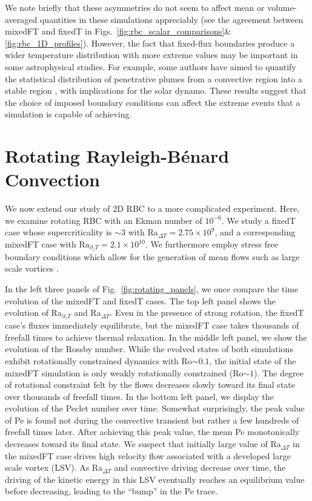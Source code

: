 \documentclass[aps, pre, onecolumn, nofootinbib, notitlepage, groupedaddress, amsfonts, amssymb, amsmath, longbibliography]{revtex4-1}
\newcommand{\RB}{Rayleigh-B\'{e}nard }
\begin{document}
We note briefly that these asymmetries do not seem to affect mean or volume-averaged quantities in these simulations appreciably (see the agreement between mixedFT and fixedT in Figs.~\ref{fig:rbc_scalar_comparisons}\&\ref{fig:rbc_1D_profiles}).
However, the fact that fixed-flux boundaries produce a wider temperature distribution with more extreme values may be important in some astrophysical studies.
For example, some authors have aimed to quantify the statistical distribution of penetrative plumes from a convective region into a stable region \cite{pratt&all2017}, with implications for the solar dynamo.
These results suggest that the choice of imposed boundary conditions can affect the extreme events that a simulation is capable of achieving.





\section{Rotating \RB Convection}
\label{sec:rotating_results}
We now extend our study of 2D RBC to a more complicated experiment.
Here, we examine rotating RBC with an Ekman number of $10^{-6}$.
We study a fixedT case whose supercriticality is $\sim 3$ with Ra$_{\Delta T} = 2.75\times 10^9$, and a corresponding mixedFT case with $\text{Ra}_{\partial_z T} = 2.1 \times 10^{10}$.
We furthermore employ stress free boundary conditions which allow for the generation of mean flows such as large scale vortices \cite{couston&all2019}.

In the left three panels of Fig.~\ref{fig:rotating_panels}, we once compare the time evolution of the mixedFT and fixedT cases.
The top left panel shows the evolution of Ra$_{\partial_z T}$ and Ra$_{\Delta T}$.
Even in the presence of strong rotation, the fixedT case's fluxes immediately equilibrate, but the mixedFT case takes thousands of freefall times to achieve thermal relaxation.
In the middle left panel, we show the evolution of the Rossby number.
While the evolved states of both simulations exhibit rotationally constrained dynamics with Ro$\sim 0.1$, the initial state of the mixedFT simulation is only weakly rotationally constrained (Ro$\sim 1$).
The degree of rotational constraint felt by the flows decreases slowly toward its final state over thousands of freefall times.
In the bottom left panel, we display the evolution of the Peclet number over time.
Somewhat surprisingly, the peak value of Pe is found not during the convective transient but rather a few hundreds of freefall times later.
After achieving this peak value, the mean Pe monotonically decreases toward its final state.
We suspect that initially large value of Ra$_{\Delta T}$ in the mixedFT case drives high velocity flow associated with a developed large scale vortex (LSV).
As Ra$_{\Delta T}$ and convective driving decrease over time, the driving of the kinetic energy in this LSV eventually reaches an equilibrium value before decreasing, leading to the ``bump'' in the Pe trace.
\end{document}

